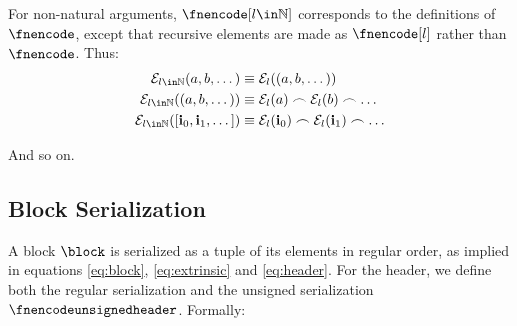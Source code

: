For non-natural arguments, $\fnencode[l \in \N]$ corresponds to the definitions of $\fnencode$, except that recursive elements are made as $\fnencode[l]$ rather than $\fnencode$. Thus:
\begin{align}
  \encode[l \in \N]{a, b, \dots} &\equiv \encode[l]{\tup{a, b, \dots}}\\
  \encode[l \in \N]{\tup{a, b, \dots}} &\equiv \encode[l]{a} \concat \encode[l]{b} \concat \dots\\
  \encode[l \in \N]{\sq{\mathbf{i}_0, \mathbf{i}_1, \dots}} &\equiv \encode[l]{\mathbf{i}_0} \concat \encode[l]{\mathbf{i}_1} \concat \dots
\end{align}

And so on.

\subsection{Block Serialization}

A block $\block$ is serialized as a tuple of its elements in regular order, as implied in equations \ref{eq:block}, \ref{eq:extrinsic} and \ref{eq:header}. For the header, we define both the regular serialization and the unsigned serialization $\fnencodeunsignedheader$. Formally:

